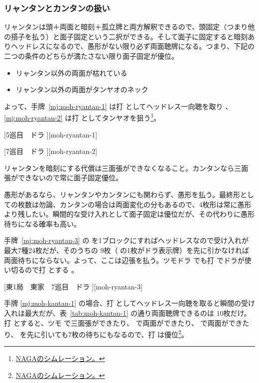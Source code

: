 \documentclass[../nankiru_main.tex]{subfiles}
\begin{document}
\subsubsection*{リャンタンとカンタンの扱い}

リャンタンは頭＋両面と暗刻＋孤立牌と両方解釈できるので、頭固定（つまり他の搭子を払う）と面子固定という二択ができる。そして面子に固定すると暗刻ありヘッドレスになるので、愚形がない限り必ず両面聴牌になる。つまり、下記の二つの条件のどちらが満たさない限り面子固定が優位。

\begin{itemize}
  \item リャンタン以外の両面が枯れている
  \item リャンタン以外の両面がタンヤオのネック
\end{itemize}

よって、手牌~\ref{mj:moh-ryantan-1} は打  としてヘッドレス一向聴を取り \citep{hirasawa-headless}、\ref{mj:moh-ryantan-2} は打  としてタンヤオを狙う\footnote{\href{https://naga.dmv.nico/htmls/5b6f95886a07c321e36addbaebbaac78fc380d0ba4b63b9fe9b3001039e27aa2v2_2.html?tw=1}{NAGAのシムレーション。}}。

[5巡目　ドラ ][moh-ryantan-1]

[7巡目　ドラ ][moh-ryantan-2]

リャンタンを暗刻にする代償は三面張ができなくなること。カンタンなら三面張ができないので常に面子固定優位。

愚形があるなら、リャンタンやカンタンにも関わらず、愚形を払う。最終形としての枚数は勿論、カンタンの場合は両面変化の分もあるので、4枚形は常に愚形より残したい。瞬間的な受け入れとして面子固定は優位だが、その代わりに愚形待ちになる確率も高い。

手牌~\ref{mj:moh-ryantan-3} の  を1ブロックにすればヘッドレスなので受け入れが最大7種24枚だが、そのうちの  9枚（ の1枚がドラ表示牌）を先に引かなければ両面待ちにならない。よって、ここは辺張を払う。ツモドラ  でも打  でドラが使い切るので打  とする \citep[][p.~16]{uzaku-nankiru}。

[東1局　東家　7巡目　ドラ ][moh-ryantan-3]

手牌 \ref{mj:moh-kantan-1} の場合、打  としてヘッドレス一向聴を取ると瞬間の受け入れは最大だが、表~\ref{tab:moh-kantan-1} の通り両面聴牌できるのは  10枚だけ。打  とすると、ツモ  で三面張ができたり、 で両面ができたり、 で両面ができたり、 を先に引いても7枚の待ちにもなるので、打  は優位\footnote{\href{https://naga.dmv.nico/htmls/8a922a065bc305f20e4187112c58dfbf10251f2e52c1dc3730d6704ca7b5164bv2_2.html?tw=1}{NAGAのシムレーション。}}。
\end{document}
